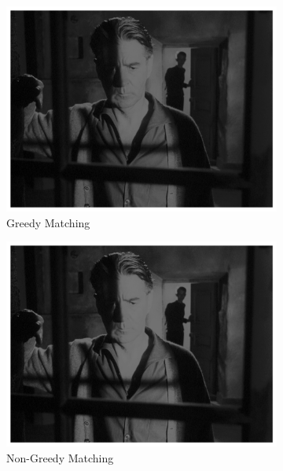 \documentclass[12pt,a4paper]{article}
\begin{document}
\begin{figure}[H]
    \centering
    \begin{subfigure}{0.32\textwidth}
        \includegraphics[width=\textwidth]{results/images/matched_greedy.png}
        \caption{Greedy Matching}
    \end{subfigure}
    \hfill
    \begin{subfigure}{0.32\textwidth}
        \includegraphics[width=\textwidth]{results/images/matched_non-greedy.png}
        \caption{Non-Greedy Matching}
    \end{subfigure}
    \hfill
    \begin{subfigure}{0.32\textwidth}

\end{subfigure}
\end{figure}
\end{document}

